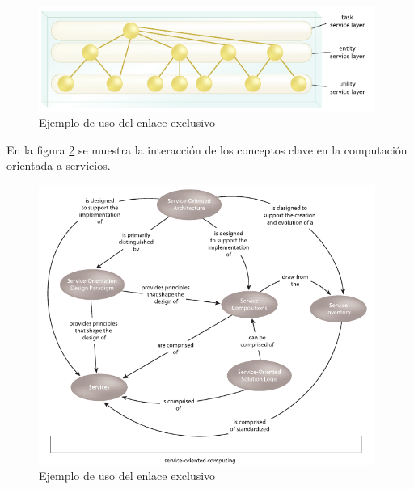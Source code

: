 \begin{figure}[!htb]
  \begin{center}
    \includegraphics[width=11cm]{./imagenes/5.png}
    \caption{Ejemplo de uso del enlace exclusivo}
    \label{fig:cinco}
  \end{center}
\end{figure}

En la figura \ref{fig:cuatro} se muestra la interacción de los conceptos clave en la computación orientada a servicios.

\begin{figure}[!htb]
  \begin{center}
    \includegraphics[width=11cm]{./imagenes/4.png}
    \caption{Ejemplo de uso del enlace exclusivo}
    \label{fig:cuatro}
  \end{center}
\end{figure}
